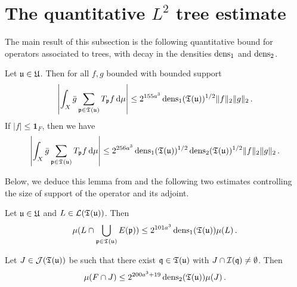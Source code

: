 \section{The quantitative \texorpdfstring{$L^2$}{L2} tree estimate}

The main result of this subsection is the following quantitative bound for operators associated to trees, with decay in the densities $\operatorname{\operatorname{dens}}_1$ and $\operatorname{\operatorname{dens}}_2$.

\begin{lemma}
    \label{densities-tree-bound}
    \leanok
    Let ${\mathfrak u} \in {\mathfrak U}$. Then for all $f,g$ bounded with bounded support
    \begin{equation}
        \label{eq-cor-tree-est}
        \left|\int_X \bar g \sum_{{\mathfrak p} \in {\mathfrak T}({\mathfrak u})} T_{{\mathfrak p} }f \, \mathrm{d}\mu \right| \le 2^{155a^3} \operatorname{\operatorname{dens}}_1({\mathfrak T}({\mathfrak u}))^{1/2} \|f\|_2\|g\|_2\,.
    \end{equation}
    If $|f| \le \mathbf{1}_F$, then we have
    \begin{equation}
        \label{eq-cor-tree-est-F}
        \left| \int_X \bar g \sum_{{\mathfrak p} \in {\mathfrak T}({\mathfrak u})} T_{{\mathfrak p} }f\, \mathrm{d}\mu \right| \le 2^{256a^3} \operatorname{\operatorname{dens}}_1({\mathfrak T}({\mathfrak u}))^{1/2} \operatorname{\operatorname{dens}}_2({\mathfrak T}({\mathfrak u}))^{1/2} \|f\|_2\|g\|_2\,.
    \end{equation}
\end{lemma}

Below, we deduce this lemma from  and the following two estimates controlling the size of support of the operator and its adjoint.

\begin{lemma}
    \label{local-dens1-tree-bound}
    \leanok
    Let ${\mathfrak u} \in {\mathfrak U}$ and $L \in \mathcal{L}({\mathfrak T}({\mathfrak u}))$. Then
    \begin{equation}
    \label{eq-1density-estimate-tree}
        \mu(L \cap \bigcup_{{\mathfrak p} \in {\mathfrak T}({\mathfrak u})} E({\mathfrak p})) \le 2^{101a^3} \operatorname{\operatorname{dens}}_1({\mathfrak T}({\mathfrak u})) \mu(L)\,.
    \end{equation}
\end{lemma}

\begin{lemma}
    \label{local-dens2-tree-bound}
    \leanok
    Let $J \in \mathcal{J}({\mathfrak T}({\mathfrak u}))$ be such that there exist ${\mathfrak q} \in {\mathfrak T}({\mathfrak u})$ with $J \cap {\mathcal{I}}({\mathfrak q}) \ne \emptyset$. Then
    $$
        \mu(F \cap J) \le 2^{200a^3 + 19} \operatorname{\operatorname{dens}}_2({\mathfrak T}({\mathfrak u})) \mu(J)\,.
    $$
\end{lemma}

